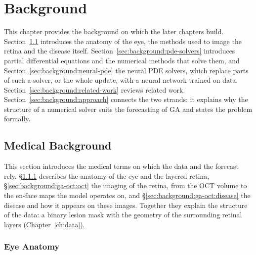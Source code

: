 \cleardoubleoddpage%
\chapter{Background}
\label{ch:background}

This chapter provides the background on which the later chapters build.
Section~\ref{sec:background:ga-oct} introduces the anatomy of the eye,
the methods used to image the retina and the disease itself.
Section~\ref{sec:background:pde-solvers} introduces partial differential
equations and the numerical methods that solve them, and
Section~\ref{sec:background:neural-pde} the neural PDE solvers, which
replace parts of such a solver, or the whole update, with a neural
network trained on data. Section~\ref{sec:background:related-work}
reviews related work. Section~\ref{sec:background:approach} connects the
two strands: it explains why the structure of a numerical solver suits
the forecasting of GA and states the problem formally.


\section{Medical Background}
\label{sec:background:ga-oct}

This section introduces the medical terms on which the data and the
forecast rely. \S\ref{sec:background:ga-oct:anatomy} describes the
anatomy of the eye and the layered retina,
\S\ref{sec:background:ga-oct:oct} the imaging of the retina, from the OCT
volume to the en-face maps the model operates on, and
\S\ref{sec:background:ga-oct:disease} the disease and how it appears on
these images. Together they explain the structure of the data: a binary
lesion mask with the geometry of the surrounding retinal layers
(Chapter~\ref{ch:data}).


\subsection{Eye Anatomy}
\label{sec:background:ga-oct:anatomy}


